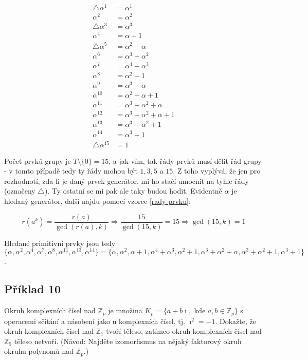 \documentclass{article}
\begin{document}
\begin{align*}
\triangle \alpha^1 & = \alpha^1\\
\alpha^2 & = \alpha^2\\
\triangle \alpha^3 & = \alpha^3\\
\alpha^4 & = \alpha + 1\\
\triangle \alpha^5 & = \alpha^2 + \alpha\\
\alpha^6 & = \alpha^3 + \alpha^2\\
\alpha^7 & = \alpha^4 + \alpha^3\\
\alpha^8 & = \alpha^2 + 1\\
\alpha^9 & = \alpha^3 + \alpha\\
\alpha^{10} & = \alpha^2 + \alpha + 1\\
\alpha^{11} & = \alpha^3 + \alpha^2 + \alpha\\
\alpha^{12} & = \alpha^3 + \alpha^2 + \alpha + 1\\
\alpha^{13} & = \alpha^3 + \alpha^2 + 1\\
\alpha^{14} & = \alpha^3 + 1\\
\triangle \alpha^{15} & = 1
\end{align*}

Počet prvků grupy je $T \setminus \{0\} = 15$, a jak vím, tak řády prvků musí dělit řád grupy - v tomto případě tedy ty řády mohou být $1, 3, 5$ a $15$. Z toho vyplývá, že jen pro rozhodnotí, zda-li je daný prvek generátor, mi ho stačí umocnit na tyhle řády (označeny $\triangle$). Ty ostatní se mi pak ale taky budou hodit.
Evidentně $\alpha$ je hledaný generátor, další najdu pomocí vzorce \ref{rady-prvku}:

\[ r(a^k) = \frac{r(a)}{\gcd(r(a), k)} \Rightarrow \frac{15}{\gcd(15, k)} = 15 \Rightarrow \gcd(15, k) = 1 \]

Hledané primitivní prvky jsou tedy $\{\alpha, \alpha^2, \alpha^4, \alpha^7, \alpha^8, \alpha^{11}, \alpha^{13}, \alpha^{14}\} = \{\alpha, \alpha^2, \alpha + 1, \alpha^4 + \alpha^3, \alpha^2 + 1, \alpha^3 + \alpha^2 + \alpha, \alpha^3 + \alpha^2 + 1, \alpha^3 + 1 \}$. 

\subsection{Příklad 10}
Okruh komplexních čísel nad $\mathbb{Z}_p$ je množina $K_p = \{a + b\imath,\mbox{ kde } a,b \in \mathbb{Z}_p \}$ s operacemi sčítání a násobení jako u komplexních čísel, tj. $\imath^2 = -1$. Dokažte, že okruh komplexních čísel nad $\mathbb{Z}_7$ tvoří těleso, zatímco okruh komplexních čísel nad $\mathbb{Z}_5$ těleso netvoří. (Návod: Najděte izomorfismus na nějaký faktorový okruh okruhu polynomů nad $\mathbb{Z}_p$.)
\end{document}
